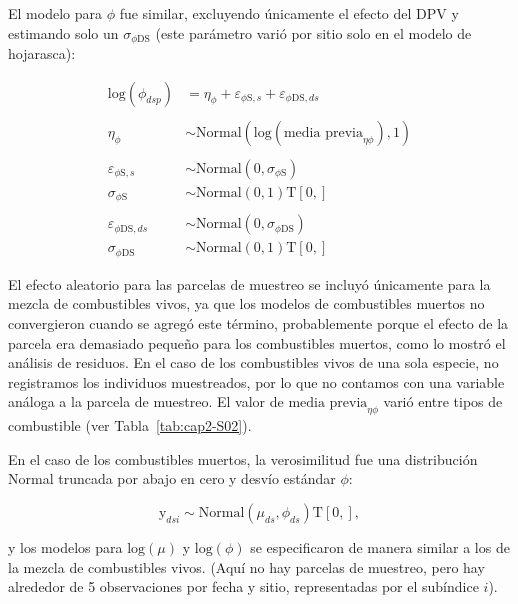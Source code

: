 El modelo para $\phi$ fue similar, excluyendo únicamente el efecto del DPV y estimando solo un $\sigma_{\phi \text{DS}}$ (este parámetro varió por sitio solo en el modelo de hojarasca):  

\begin{equation}
    \begin{aligned}
    \text{log}(\phi_{dsp}) &= \eta_\phi + \varepsilon_{\phi \text{S}, s} + \varepsilon_{\phi \text{DS}, ds}\\
    \\
    \eta_{\phi} &\sim \text{Normal}(\text{log}(\text{media previa}_{\eta \phi}), 1) \\
    \\
    \varepsilon_{\phi \text{S}, s} &\sim \text{Normal}(0, \sigma_{\phi \text{S}}) \\ 
    \sigma_{\phi \text{S}} &\sim \text{Normal}(0, 1)\text{T}[0, ] \\
    \\
    \varepsilon_{\phi \text{DS}, ds} &\sim \text{Normal}(0, \sigma_{\phi \text{DS}}) \\
    \sigma_{\phi \text{DS}} &\sim \text{Normal}(0, 1)\text{T}[0, ]
    \end{aligned}    
\end{equation}

El efecto aleatorio para las parcelas de muestreo se incluyó únicamente para la mezcla de combustibles vivos, ya que los modelos de combustibles muertos no convergieron cuando se agregó este término, probablemente porque el efecto de la parcela era demasiado pequeño para los combustibles muertos, como lo mostró el análisis de residuos. En el caso de los combustibles vivos de una sola especie, no registramos los individuos muestreados, por lo que no contamos con una variable análoga a la parcela de muestreo. El valor de $\text{media previa}_{\eta \phi}$ varió entre tipos de combustible (ver Tabla~\ref{tab:cap2-S02}).

En el caso de los combustibles muertos, la verosimilitud fue una distribución Normal truncada por abajo en cero y desvío estándar $\phi$:  

\[
\text{y}_{dsi} \sim \text{Normal}(\mu_{ds}, \phi_{ds})\text{T}[0, ],
\]

\noindent y los modelos para $\text{log}(\mu)$ y $\text{log}(\phi)$ se especificaron de manera similar a los de la mezcla de combustibles vivos. (Aquí no hay parcelas de muestreo, pero hay alrededor de 5 observaciones por fecha y sitio, representadas por el subíndice $i$).

